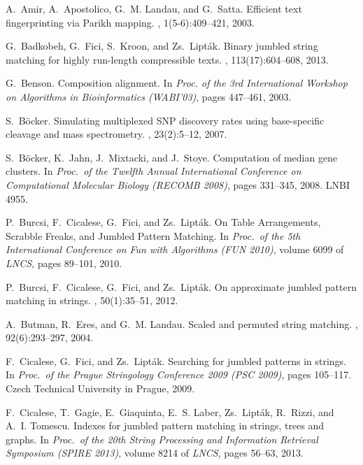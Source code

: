 \documentclass[11pt,a4paper]{llncs}
\begin{document}
\begin{small}
\begin{thebibliography}{10}

A.~Amir, A.~Apostolico, G.~M. Landau, and G.~Satta.
\newblock Efficient text fingerprinting via {Parikh} mapping.
, 1(5-6):409--421, 2003.

G.~Badkobeh, G.~Fici, S.~Kroon, and {\relax Zs}.~Lipt{\'a}k.
\newblock Binary jumbled string matching for highly run-length compressible
  texts.
, 113(17):604--608, 2013.

G.~Benson.
\newblock Composition alignment.
\newblock In {\em Proc. of the 3rd International Workshop on Algorithms in
  Bioinformatics (WABI'03)}, pages 447--461, 2003.

S.~B{\"o}cker.
\newblock Simulating multiplexed {SNP} discovery rates using base-specific
  cleavage and mass spectrometry.
, 23(2):5--12, 2007.

S.~B\"ocker, K.~Jahn, J.~Mixtacki, and J.~Stoye.
\newblock Computation of median gene clusters.
\newblock In {\em Proc.\ of the Twelfth Annual International Conference on
  Computational Molecular Biology (RECOMB 2008)}, pages 331--345, 2008.
\newblock LNBI 4955.

P.~Burcsi, F.~Cicalese, G.~Fici, and {\relax Zs}.~Lipt{\'a}k.
\newblock On {T}able {A}rrangements, {S}crabble {F}reaks, and {J}umbled
  {P}attern {M}atching.
\newblock In {\em Proc.\ of the 5th International Conference on Fun with
  Algorithms ({FUN} 2010)}, volume 6099 of {\em LNCS}, pages 89--101, 2010.

P.~Burcsi, F.~Cicalese, G.~Fici, and {\relax Zs}.~Lipt{\'a}k.
\newblock On approximate jumbled pattern matching in strings.
, 50(1):35--51, 2012.

A.~Butman, R.~Eres, and G.~M. Landau.
\newblock Scaled and permuted string matching.
, 92(6):293--297, 2004.

F.~Cicalese, G.~Fici, and {\relax Zs}.~Lipt{\'a}k.
\newblock Searching for jumbled patterns in strings.
\newblock In {\em Proc.\ of the Prague Stringology Conference 2009 (PSC 2009)},
  pages 105--117. Czech Technical University in Prague, 2009.

F.~Cicalese, T.~Gagie, E.~Giaquinta, E.~S. Laber, {\relax Zs}.~Lipt{\'a}k,
  R.~Rizzi, and A.~I. Tomescu.
\newblock Indexes for jumbled pattern matching in strings, trees and graphs.
\newblock In {\em Proc.\ of the 20th String Processing and Information
  Retrieval Symposium (SPIRE 2013)}, volume 8214 of {\em LNCS}, pages 56--63,
  2013.


\end{thebibliography}
\end{small}
\end{document}

